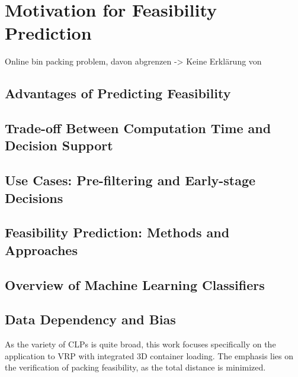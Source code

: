 \chapter{Motivation for Feasibility Prediction}
Online bin packing problem, davon abgrenzen -> Keine Erklärung von
\section{Advantages of Predicting Feasibility}
\section{Trade-off Between Computation Time and Decision Support}
\section{Use Cases: Pre-filtering and Early-stage Decisions}
\section{Feasibility Prediction: Methods and Approaches}
\section{Overview of Machine Learning Classifiers}
\section{Data Dependency and Bias}






As the variety of \gls{CLP}s is quite broad, this work focuses specifically on
the application to \gls{VRP} with integrated \gls{3D} container loading. The emphasis lies
on the verification of packing feasibility, as the total distance is minimized.